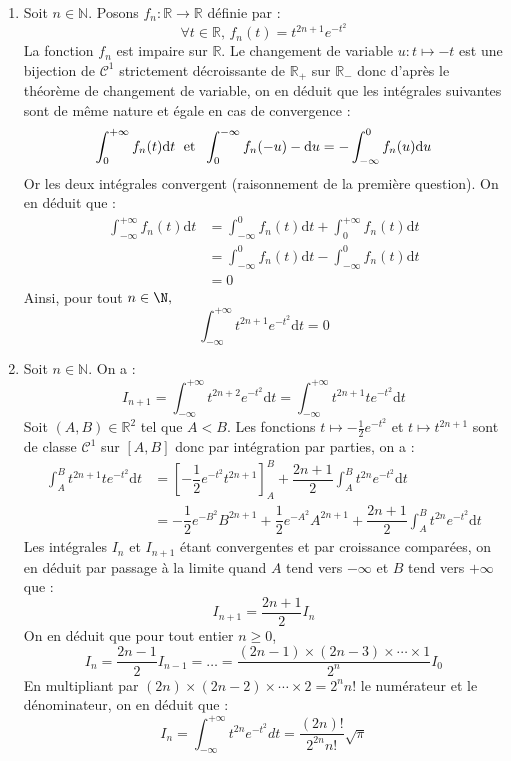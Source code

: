 \documentclass[twoside,french,11pt]{VcCours}
\newcommand{\dt}{\text{d}t}
\begin{document}
\begin{enumerate}
\begin{enumerate}
      
      
      \item Soit $n \in \mathbb{N}$. Posons $f_n : \mathbb{R} \rightarrow \mathbb{R}$ définie par :
      $$ \forall t \in \mathbb{R}, \, f_n(t) = t^{2n+1}e^{-t^2}$$
      La fonction $f_n$ est impaire sur $\mathbb{R}$. Le changement de variable $ u : t \mapsto -t$ est une bijection de $\mathcal{C}^1$ strictement décroissante de $\mathbb{R}_+$ sur $\mathbb{R}_{-}$ donc d'après le théorème de changement de variable, on en déduit que les intégrales suivantes sont de même nature et égale en cas de convergence :
  $$ \int_{0}^{+ \infty} f_n(t) \dt \; \hbox{ et } \; \int_{0}^{- \infty} f_n(-u) - \textrm{d}u = - \int_{- \infty}^0 f_n(u) \textrm{d}u$$
  Or les deux intégrales convergent (raisonnement de la première question). On en déduit que :
  \begin{align*}
  \int_{-\infty}^{+\infty} f_n(t) \dt & = \int_{-\infty}^{0} f_n(t) \dt + \int_{0}^{+\infty} f_n(t) \dt \\
  & = \int_{-\infty}^{0} f_n(t) \dt - \int_{-\infty}^{0} f_n(t) \dt \\
  & = 0
  \end{align*}
  Ainsi, pour tout $n\in\N,$ 
  $$ \boxed{\int_{-\infty}^{+\infty}t^{2n+1}e^{-t^2}\dt=0}$$
      
      \item Soit $n \in \mathbb{N}$. On a :
      $$ I_{n+1} = \int_{-\infty}^{+\infty}t^{2n+2}e^{-t^2}\dt = \int_{-\infty}^{+\infty}t^{2n+1} te^{-t^2}\dt$$
  Soit $(A,B) \in \mathbb{R}^2$ tel que $A<B$. Les fonctions $t \mapsto - \tfrac{1}{2} e^{-t^2}$ et $t \mapsto t^{2n+1}$ sont de classe $\mathcal{C}^1$ sur $[A,B]$ donc par intégration par parties, on a :
  \begin{align*}
  \int_{A}^{B}t^{2n+1} te^{-t^2}\dt & = \left[ - \dfrac{1}{2} e^{-t^2} t^{2n+1} \right]_A^B + \dfrac{2n+1}{2} \int_{A}^{B} t^{2n} e^{-t^2} \dt \\
  & =  - \dfrac{1}{2} e^{-B^2} B^{2n+1} +   \dfrac{1}{2} e^{-A^2} A^{2n+1} + \dfrac{2n+1}{2} \int_{A}^{B} t^{2n} e^{-t^2} \dt
  \end{align*}
  Les intégrales $I_n$ et $I_{n+1}$ étant convergentes et par croissance comparées, on en déduit par passage à la limite quand $A$ tend vers $- \infty$ et $B$ tend vers $+ \infty$ que :
  $$ \boxed{I_{n+1}=\frac{2n+1}{2}I_n}$$
  On en déduit que pour tout entier $n \geq 0$,
  $$I_n=\frac{2n-1}{2}I_{n-1}=\dots=\frac{(2n-1)\times(2n-3)\times\cdots \times1}{2^n}I_{0}$$
  En multipliant par $(2n)\times(2n-2)\times\cdots\times 2=2^nn!$ le numérateur et le dénominateur, on en déduit que :
  $$ \boxed{ I_{n}=\int_{-\infty}^{+\infty}t^{2n}e^{-t^2}dt=\frac{(2n)!}{2^{2n}n!}\sqrt{\pi}}$$ 
  \end{enumerate}
    

\end{enumerate}
\end{document}
